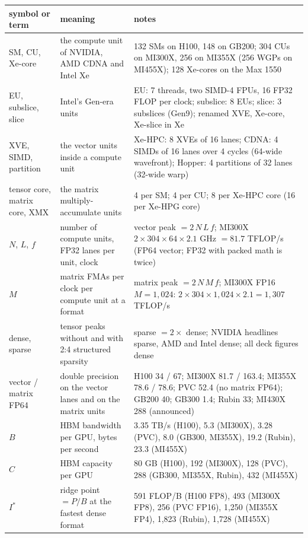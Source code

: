 \documentclass[11pt,letterpaper]{article}
\begin{document}
\begin{center}\scriptsize\setlength{\tabcolsep}{4pt}\renewcommand{\arraystretch}{1.05}
\begin{tabular}{@{}lp{4.7cm}p{7.0cm}@{}}
\toprule
symbol or term & meaning & notes\\
\midrule
SM, CU, Xe-core & the compute unit of NVIDIA, AMD CDNA and Intel Xe & 132 SMs on H100, 148 on GB200; 304 CUs on MI300X, 256 on MI355X (256 WGPs on MI455X); 128 Xe-cores on the Max 1550\\
EU, subslice, slice & Intel's Gen-era units & EU: 7 threads, two SIMD-4 FPUs, 16 FP32 FLOP per clock; subslice: 8 EUs; slice: 3 subslices (Gen9); renamed XVE, Xe-core, Xe-slice in Xe\\
XVE, SIMD, partition & the vector units inside a compute unit & Xe-HPC: 8 XVEs of 16 lanes; CDNA: 4 SIMDs of 16 lanes over 4 cycles (64-wide wavefront); Hopper: 4 partitions of 32 lanes (32-wide warp)\\
tensor core, matrix core, XMX & the matrix multiply-accumulate units & 4 per SM; 4 per CU; 8 per Xe-HPC core (16 per Xe-HPG core)\\
$N$, $L$, $f$ & number of compute units, FP32 lanes per unit, clock & vector peak $= 2\,N\,L\,f$; MI300X $2\times 304\times 64\times 2.1$ GHz $= 81.7$ TFLOP/s (FP64 vector; FP32 with packed math is twice)\\
$M$ & matrix FMAs per clock per compute unit at a format & matrix peak $= 2\,N\,M\,f$; MI300X FP16 $M = 1{,}024$: $2\times 304\times 1{,}024\times 2.1 = 1{,}307$ TFLOP/s\\
dense, sparse & tensor peaks without and with 2:4 structured sparsity & sparse $= 2\times$ dense; NVIDIA headlines sparse, AMD and Intel dense; all deck figures dense\\
vector / matrix FP64 & double precision on the vector lanes and on the matrix units & H100 34 / 67; MI300X 81.7 / 163.4; MI355X 78.6 / 78.6; PVC 52.4 (no matrix FP64); GB200 40; GB300 1.4; Rubin 33; MI430X 288 (announced)\\
$B$ & HBM bandwidth per GPU, bytes per second & 3.35 TB/s (H100), 5.3 (MI300X), 3.28 (PVC), 8.0 (GB300, MI355X), 19.2 (Rubin), 23.3 (MI455X)\\
$C$ & HBM capacity per GPU & 80 GB (H100), 192 (MI300X), 128 (PVC), 288 (GB300, MI355X, Rubin), 432 (MI455X)\\
$I^\ast$ & ridge point $= P/B$ at the fastest dense format & 591 FLOP/B (H100 FP8), 493 (MI300X FP8), 256 (PVC FP16), 1{,}250 (MI355X FP4), 1{,}823 (Rubin), 1{,}728 (MI455X)\\

\end{tabular}
\end{center}
\end{document}
